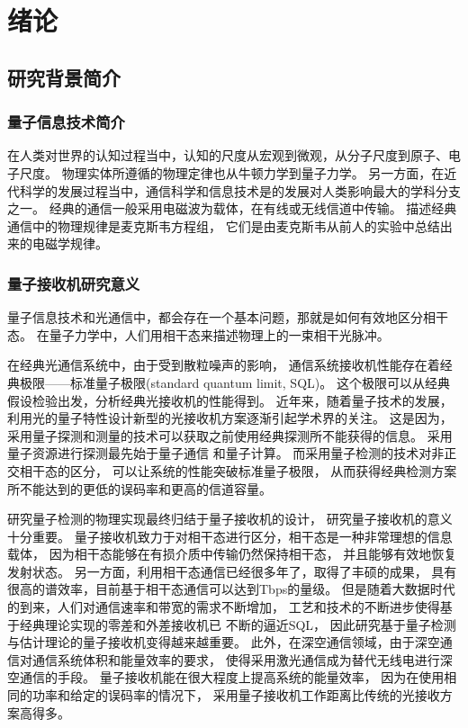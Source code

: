 \chapter{绪论}
\section{研究背景简介}

\subsection{量子信息技术简介}
在人类对世界的认知过程当中，认知的尺度从宏观到微观，从分子尺度到原子、电子尺度。
物理实体所遵循的物理定律也从牛顿力学到量子力学。
另一方面，在近代科学的发展过程当中，通信科学和信息技术是的发展对人类影响最大的学科分支之一。
经典的通信一般采用电磁波为载体，在有线或无线信道中传输。
描述经典通信中的物理规律是麦克斯韦方程组，
它们是由麦克斯韦从前人的实验中总结出来的电磁学规律。

\subsection{量子接收机研究意义}
量子信息技术和光通信中，都会存在一个基本问题，那就是如何有效地区分相干态。
在量子力学中，人们用相干态来描述物理上的一束相干光脉冲。

在经典光通信系统中，由于受到散粒噪声的影响，
通信系统接收机性能存在着经典极限——标准量子极限(standard quantum limit, SQL)。
这个极限可以从经典假设检验出发，分析经典光接收机的性能得到。
近年来，随着量子技术的发展，利用光的量子特性设计新型的光接收机方案逐渐引起学术界的关注。
这是因为，采用量子探测和测量的技术可以获取之前使用经典探测所不能获得的信息。
采用量子资源进行探测最先始于量子通信\cite{gisin2007quantum}
和量子计算\cite{ladd2010quantum}。
而采用量子检测的技术对非正交相干态的区分，
可以让系统的性能突破标准量子极限，
从而获得经典检测方案所不能达到的更低的误码率\cite{helstrom1976quantum}和更高的信道容量\cite{hausladen1996classical}。

研究量子检测的物理实现最终归结于量子接收机的设计，
研究量子接收机的意义十分重要。
量子接收机致力于对相干态进行区分，相干态是一种非常理想的信息载体，
因为相干态能够在有损介质中传输仍然保持相干态，
并且能够有效地恢复发射状态。
另一方面，利用相干态通信已经很多年了，取得了丰硕的成果，
具有很高的谱效率，目前基于相干态通信可以达到Tbps的量级\cite{jinno2007networks}。
但是随着大数据时代的到来，人们对通信速率和带宽的需求不断增加，
工艺和技术的不断进步使得基于经典理论实现的零差和外差接收机已
不断的逼近SQL\cite{tsukamoto2006unrepeated}，
因此研究基于量子检测与估计理论的量子接收机变得越来越重要。
此外，在深空通信领域，由于深空通信对通信系统体积和能量效率的要求，
使得采用激光通信成为替代无线电进行深空通信的手段\cite{hemmati2006deep}。
量子接收机能在很大程度上提高系统的能量效率，
因为在使用相同的功率和给定的误码率的情况下，
采用量子接收机工作距离比传统的光接收方案高得多\cite{helstrom1976quantum}。



